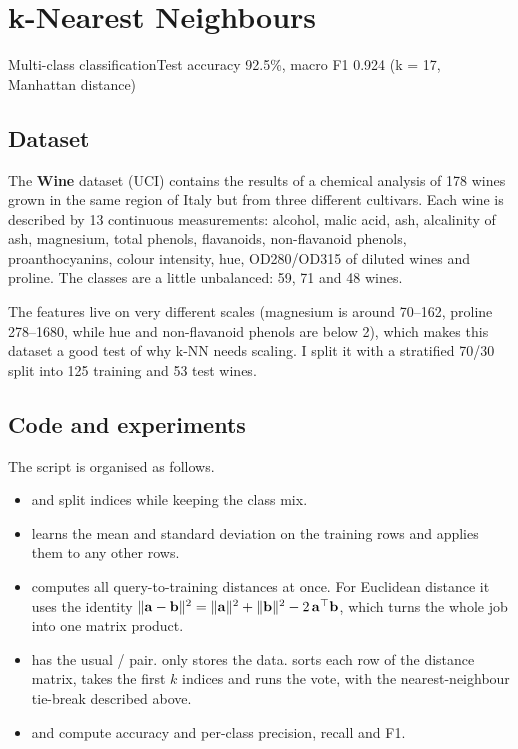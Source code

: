 \chapter{k-Nearest Neighbours}

{Multi-class classification}{Test accuracy 92.5\%, macro F1 0.924 (k = 17, Manhattan distance)}

\section{Dataset}
The \textbf{Wine} dataset (UCI) contains the results of a chemical analysis of 178 wines grown in the
same region of Italy but from three different cultivars. Each wine is described by 13 continuous
measurements: alcohol, malic acid, ash, alcalinity of ash, magnesium, total phenols, flavanoids,
non-flavanoid phenols, proanthocyanins, colour intensity, hue, OD280/OD315 of diluted wines and
proline. The classes are a little unbalanced: 59, 71 and 48 wines.

The features live on very different scales (magnesium is around 70--162, proline 278--1680, while hue
and non-flavanoid phenols are below 2), which makes this dataset a good test of why k-NN needs scaling.
I split it with a stratified 70/30 split into 125 training and 53 test wines.

\section{Code and experiments}
The script  is organised as follows.
\begin{itemize}
  \item {} and  split indices while keeping the class mix.
  \item {} learns the mean and standard deviation on the training rows and applies them
        to any other rows.
  \item {} computes all query-to-training distances at once. For Euclidean distance
        it uses the identity $\|\mathbf{a}-\mathbf{b}\|^2=\|\mathbf{a}\|^2+\|\mathbf{b}\|^2-2\,\mathbf{a}^\top\mathbf{b}$, which turns the
        whole job into one matrix product.
  \item {} has the usual / pair.  only stores the data.
         sorts each row of the distance matrix, takes the first $k$ indices and runs the
        vote, with the nearest-neighbour tie-break described above.
  \item {} and  compute accuracy and per-class
        precision, recall and F1.
\end{itemize}

